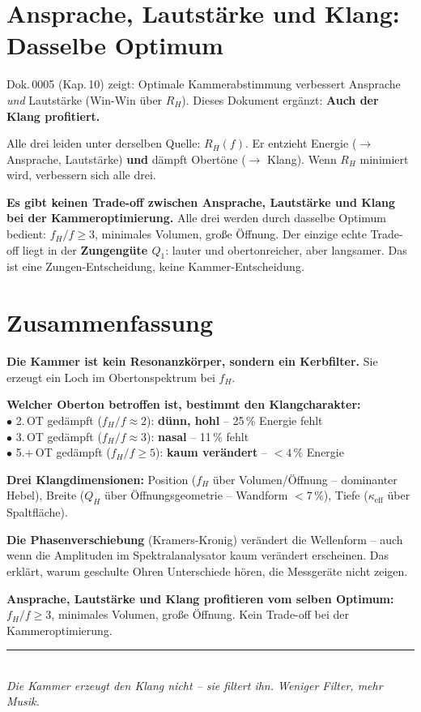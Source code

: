 \documentclass[11pt,a4paper]{article}
\begin{document}
\section{Ansprache, Lautstärke und Klang: Dasselbe Optimum}

Dok.\,0005 (Kap.\,10) zeigt: Optimale Kammerabstimmung verbessert Ansprache \textit{und} Lautstärke (Win-Win über $R_H$). Dieses Dokument ergänzt: \textbf{Auch der Klang profitiert.}

Alle drei leiden unter derselben Quelle: $R_H(f)$. Er entzieht Energie ($\to$ Ansprache, Lautstärke) \textbf{und} dämpft Obertöne ($\to$ Klang). Wenn $R_H$ minimiert wird, verbessern sich alle drei.

\begin{keybox}
\textbf{Es gibt keinen Trade-off zwischen Ansprache, Lautstärke und Klang bei der Kammeroptimierung.} Alle drei werden durch dasselbe Optimum bedient: $f_H/f \geq 3$, minimales Volumen, große Öffnung. Der einzige echte Trade-off liegt in der \textbf{Zungengüte $Q_1$}: lauter und obertonreicher, aber langsamer. Das ist eine Zungen-Entscheidung, keine Kammer-Entscheidung.
\end{keybox}


\section{Zusammenfassung}

\begin{keybox}
\textbf{Die Kammer ist kein Resonanzkörper, sondern ein Kerbfilter.} Sie erzeugt ein Loch im Obertonspektrum bei $f_H$.

\textbf{Welcher Oberton betroffen ist, bestimmt den Klangcharakter:}\\
$\bullet$ 2.\,OT gedämpft ($f_H/f \approx 2$): \textbf{dünn, hohl} -- 25\,\% Energie fehlt\\
$\bullet$ 3.\,OT gedämpft ($f_H/f \approx 3$): \textbf{nasal} -- 11\,\% fehlt\\
$\bullet$ 5.+\,OT gedämpft ($f_H/f \geq 5$): \textbf{kaum verändert} -- $< 4\,\%$ Energie

\textbf{Drei Klangdimensionen:} Position ($f_H$ über Volumen/Öffnung -- dominanter Hebel), Breite ($Q_H$ über Öffnungsgeometrie -- Wandform $< 7\,\%$), Tiefe ($\kappa_\text{eff}$ über Spaltfläche).

\textbf{Die Phasenverschiebung} (Kramers-Kronig) verändert die Wellenform -- auch wenn die Amplituden im Spektralanalysator kaum verändert erscheinen. Das erklärt, warum geschulte Ohren Unterschiede hören, die Messgeräte nicht zeigen.

\textbf{Ansprache, Lautstärke und Klang profitieren vom selben Optimum:} $f_H/f \geq 3$, minimales Volumen, große Öffnung. Kein Trade-off bei der Kammeroptimierung.
\end{keybox}

\vspace{3mm}
\begin{center}
\textcolor{accentred}{\rule{0.6\textwidth}{1pt}}\\[4pt]
{\small\itshape Die Kammer erzeugt den Klang nicht -- sie filtert ihn. Weniger Filter, mehr Musik.}
\end{center}
\end{document}
